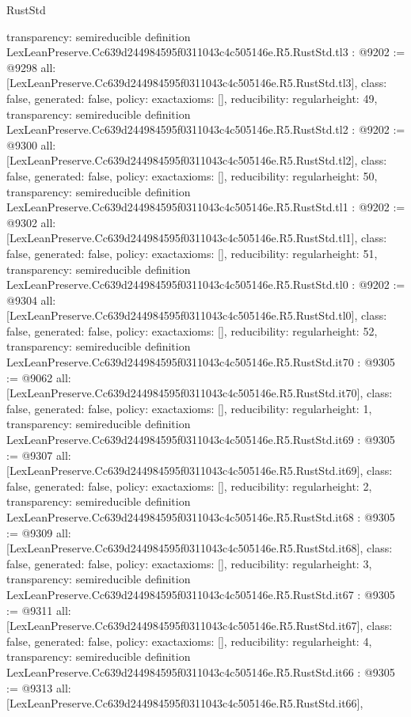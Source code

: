 \begin{lexlean}{RustStd}
\begin{coremodule}
{  transparency: semireducible
}
definition LexLeanPreserve.Cc639d244984595f0311043c4c505146e.R5.RustStd.tl3 : @9202 := @9298 {
  all: [LexLeanPreserve.Cc639d244984595f0311043c4c505146e.R5.RustStd.tl3],
  class: false,
  generated: false,
  policy: exact{axioms: []},
  reducibility: regular{height: 49},
  transparency: semireducible
}
definition LexLeanPreserve.Cc639d244984595f0311043c4c505146e.R5.RustStd.tl2 : @9202 := @9300 {
  all: [LexLeanPreserve.Cc639d244984595f0311043c4c505146e.R5.RustStd.tl2],
  class: false,
  generated: false,
  policy: exact{axioms: []},
  reducibility: regular{height: 50},
  transparency: semireducible
}
definition LexLeanPreserve.Cc639d244984595f0311043c4c505146e.R5.RustStd.tl1 : @9202 := @9302 {
  all: [LexLeanPreserve.Cc639d244984595f0311043c4c505146e.R5.RustStd.tl1],
  class: false,
  generated: false,
  policy: exact{axioms: []},
  reducibility: regular{height: 51},
  transparency: semireducible
}
definition LexLeanPreserve.Cc639d244984595f0311043c4c505146e.R5.RustStd.tl0 : @9202 := @9304 {
  all: [LexLeanPreserve.Cc639d244984595f0311043c4c505146e.R5.RustStd.tl0],
  class: false,
  generated: false,
  policy: exact{axioms: []},
  reducibility: regular{height: 52},
  transparency: semireducible
}
definition LexLeanPreserve.Cc639d244984595f0311043c4c505146e.R5.RustStd.it70 : @9305 := @9062 {
  all: [LexLeanPreserve.Cc639d244984595f0311043c4c505146e.R5.RustStd.it70],
  class: false,
  generated: false,
  policy: exact{axioms: []},
  reducibility: regular{height: 1},
  transparency: semireducible
}
definition LexLeanPreserve.Cc639d244984595f0311043c4c505146e.R5.RustStd.it69 : @9305 := @9307 {
  all: [LexLeanPreserve.Cc639d244984595f0311043c4c505146e.R5.RustStd.it69],
  class: false,
  generated: false,
  policy: exact{axioms: []},
  reducibility: regular{height: 2},
  transparency: semireducible
}
definition LexLeanPreserve.Cc639d244984595f0311043c4c505146e.R5.RustStd.it68 : @9305 := @9309 {
  all: [LexLeanPreserve.Cc639d244984595f0311043c4c505146e.R5.RustStd.it68],
  class: false,
  generated: false,
  policy: exact{axioms: []},
  reducibility: regular{height: 3},
  transparency: semireducible
}
definition LexLeanPreserve.Cc639d244984595f0311043c4c505146e.R5.RustStd.it67 : @9305 := @9311 {
  all: [LexLeanPreserve.Cc639d244984595f0311043c4c505146e.R5.RustStd.it67],
  class: false,
  generated: false,
  policy: exact{axioms: []},
  reducibility: regular{height: 4},
  transparency: semireducible
}
definition LexLeanPreserve.Cc639d244984595f0311043c4c505146e.R5.RustStd.it66 : @9305 := @9313 {
  all: [LexLeanPreserve.Cc639d244984595f0311043c4c505146e.R5.RustStd.it66],
}
\end{coremodule}
\end{lexlean}
